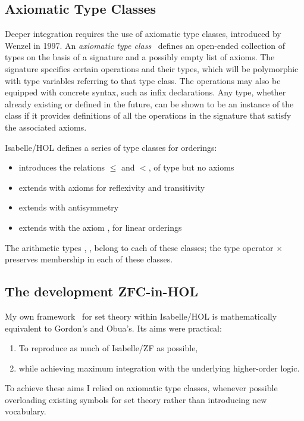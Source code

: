 \documentclass[runningheads]{llncs}
\begin{document}
\subsection{Axiomatic Type Classes}

Deeper integration requires the use of axiomatic type classes, introduced by Wenzel in 1997.
An \textit{axiomatic type class}~\cite{wenzel-type} defines an open-ended collection of types on the basis of a signature and a possibly empty list of axioms. The signature specifies certain operations and their types, which will be polymorphic with type variables referring to that type class.
The operations may also be equipped with concrete syntax, such as infix declarations.
Any type, whether already existing or defined in the future, can be shown to be an instance of the class if it provides definitions of all the operations in the signature that satisfy the associated axioms.

Isabelle/HOL defines a series of type classes for orderings:
\begin{itemize}
	\item {} introduces the relations $\le$ and $<$, of type  but no axioms
	\item {} extends  with axioms for reflexivity and transitivity
	\item {} extends  with antisymmetry
	\item {} extends  with the axiom , for linear orderings
\end{itemize}
The arithmetic types , ,  belong to each of these classes; the type operator $\times$ preserves membership in each of these classes.

\subsection{The development ZFC-in-HOL}

My own framework~\cite{ZFC_in_HOL-AFP} for set theory within Isabelle/HOL is mathematically equivalent to Gordon's and Obua's.
Its aims were practical:
\begin{enumerate}
	\item To reproduce as much of Isabelle/ZF as possible,
	\item while achieving maximum integration with the underlying higher-order logic.
\end{enumerate}
To achieve these aims I relied on axiomatic type classes, whenever possible overloading existing symbols for set theory rather than introducing new vocabulary.
\end{document}
